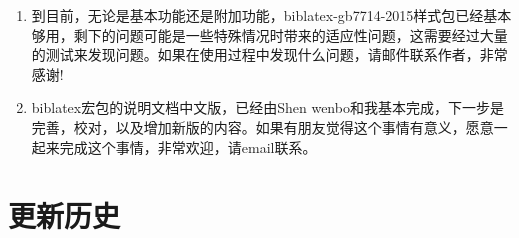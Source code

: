 \begin{enumerate}
  \item 到目前，无论是基本功能还是附加功能，biblatex-gb7714-2015样式包已经基本够用，剩下的问题可能是一些特殊情况时带来的适应性问题，这需要经过大量的测试来发现问题。如果在使用过程中发现什么问题，请邮件联系作者，非常感谢!






  \item biblatex宏包的说明文档中文版，已经由Shen wenbo和我基本完成，下一步是完善，校对，以及增加新版的内容。如果有朋友觉得这个事情有意义，愿意一起来完成这个事情，非常欢迎，请email联系。


\end{enumerate}

\section{更新历史}






